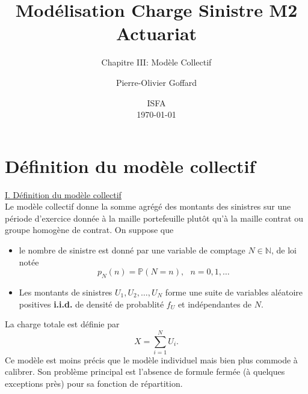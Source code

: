 \documentclass[8pt,notheorems]{beamer}
\title[]{Modélisation Charge Sinistre M2 Actuariat}
\subtitle{Chapitre III: Modèle Collectif}
\author{Pierre-Olivier Goffard}
\institute{
	   Université de Lyon 1\\
	ISFA\\
	   \texttt{pierre-olivier.goffard@univ-lyon1.fr}
	  }
\date{
ISFA\\
\today}
\def \N{\mathbb N}
\def \P {\mathbb P}
\theoremstyle{definition}
\theoremstyle{example}
\theoremstyle{mystyle}
\theoremstyle{plain}
\begin{document}
\frame{\titlepage}


\section{Définition du modèle collectif}
\begin{frame}[allowframebreaks]
\underline{I. Définition du modèle collectif}\\
Le modèle collectif donne la somme agrégé des montants des sinistres sur une période d'exercice donnée à la maille portefeuille plutôt qu'à la maille contrat ou groupe homogène de contrat. On suppose que
\begin{itemize}
    \item le nombre de sinistre est donné par une variable de comptage $N\in \N$, de loi notée
    $$
    p_N(n) = \P(N = n),\text{ }n = 0,1,\ldots
    $$
    \item Les montants de sinistres $U_1,U_2,\ldots, U_N$ forme une suite de variables aléatoire positives \textbf{i.i.d.} de densité de probablité $f_U$ et indépendantes de $N$.
\end{itemize}
La charge totale est définie par
\begin{equation}\label{eq:modele_individuel}
X = \sum_{i = 1}^{N}U_i.
\end{equation}
Ce modèle est moins précis que le modèle individuel mais bien plus commode à calibrer. Son problème principal est l'absence de formule fermée (à quelques exceptions près) pour sa fonction de répartition.
\end{frame}
\end{document}
